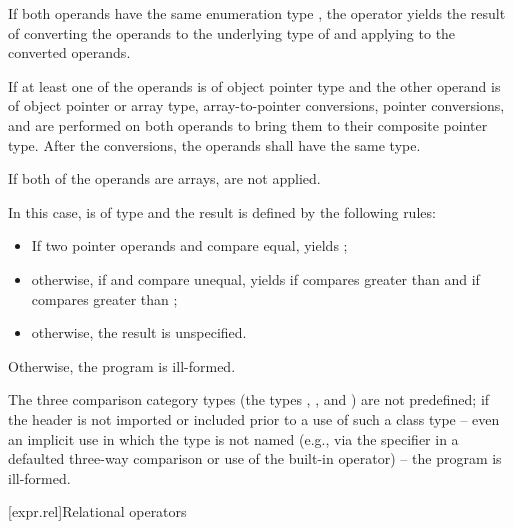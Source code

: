 \pnum
If both operands have the same enumeration type ,
the operator yields the result of
converting the operands to the underlying type of 
and applying \tcode{<=>} to the converted operands.

\pnum
If at least one of the operands is of object pointer type and
the other operand is of object pointer or array type,
array-to-pointer conversions,
pointer conversions,
and
are performed on both operands
to bring them to their composite pointer type.
After the conversions, the operands shall have the same type.
\begin{note}
If both of the operands are arrays,
 are not applied.
\end{note}
In this case,
 is of type  and
the result is defined by the following rules:
\begin{itemize}
\item
If two pointer operands  and  compare equal,
 yields ;
\item
otherwise, if  and  compare unequal,
 yields
if  compares greater than 
and
if  compares greater than ;
\item
otherwise, the result is unspecified.
\end{itemize}

\pnum
Otherwise, the program is ill-formed.

\pnum
The three comparison category types
(the types
,
, and
)
are not predefined;
if the header 
is not imported or included prior to a use of such a class type --
even an implicit use in which the type is not named
(e.g., via the  specifier
in a defaulted three-way comparison
or use of the built-in operator) -- the program is ill-formed.

[expr.rel]{Relational operators}%
%

